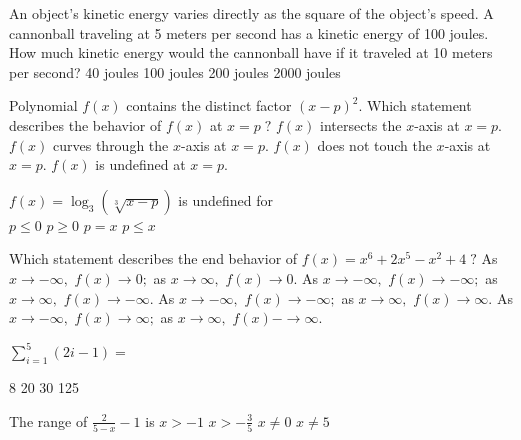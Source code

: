 \begin{question}
An object's kinetic energy varies directly as the square of the object's speed. A cannonball traveling at 5 meters per second has a kinetic energy of 100 joules. How much kinetic energy would the cannonball have if it traveled at 10 meters per second?
\choicesline
{40 joules}
{100 joules}
{200 joules}
{}
{2000 joules}
\end{question}

\begin{question}
Polynomial \(f(x)\) contains the distinct factor \((x - p)^2.\)
Which statement describes the behavior of \(f(x)\) at \(x = p \; ?\)
\choices
{\(f(x)\) intersects the \(x\)-axis at \(x = p.\)}
{\(f(x)\) curves through the \(x\)-axis at \(x = p.\)}
{}
{\(f(x)\) does not touch the \(x\)-axis at \(x = p.\)}
{\(f(x)\) is undefined at \(x = p.\)}
\end{question}

\begin{question}
\(f(x) = \log_3(\sqrt[3]{x - p})\) is undefined for \\
\choicesline
{\(p \leqslant 0\)}
{\(p \geqslant 0\)}
{\(p = x\)}
{\(p \leqslant x\)}
{}
\end{question}

\begin{question}
Which statement describes the end behavior of \(f(x) = x^6 + 2x^5 - x^2 + 4 \; ?\)
\choices
{As \(x \to -\infty,\) \(f(x) \to 0;\) as \(x \to \infty,\) \(f(x) \to 0.\)}
{As \(x \to -\infty,\) \(f(x) \to -\infty;\) as \(x \to \infty,\) \(f(x) \to -\infty.\)}
{As \(x \to -\infty,\) \(f(x) \to -\infty;\) as \(x \to \infty,\) \(f(x) \to \infty.\)}
{As \(x \to -\infty,\) \(f(x) \to \infty;\) as \(x \to \infty,\) \(f(x) -\to \infty.\)}
{}
\end{question}

\begin{question}
\(\sum_{i = 1}^5 (2i - 1) =\)

\choicesline
{8}
{20}
{}
{30}
{125}
\end{question}

\begin{question}
The range of \(\frac{2}{5 - x} - 1\) is 
\choices
{}
{\(x > -1\)}
{\(x > -\frac{3}{5}\)}
{\(x \ne 0\)}
{\(x \ne 5\)}
\end{question}


